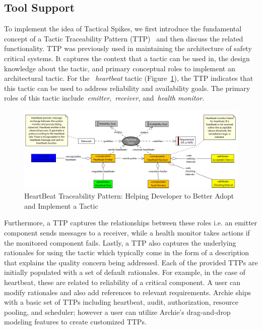 \subsection{Tool Support}
To implement the idea of Tactical Spikes, we first introduce the fundamental concept of a Tactic Traceability Pattern (TTP)~\cite{Mirakhorli:2011:TAS:1985793.1986014, ICSM11} and then discuss the related functionality. TTP was previously used in maintaining the architecture of safety critical systems. It captures the context that a tactic can be used in, the design knowledge about the tactic, and primary conceptual roles to implement an architectural tactic. For the ~\emph{heartbeat} tactic (Figure~\ref{fig:HB}), the TTP indicates that this tactic can be used to address reliability and availability goals. The primary roles of this tactic include~\emph{emitter},~\emph{receiver}, and~\emph{health monitor}. 

\begin{figure}[tbph]
\centering
\includegraphics[width=0.9\linewidth]{./HB}
\caption{HeartBeat Traceability Pattern: Helping Developer to Better Adopt and Implement a Tactic}
\label{fig:HB}
\end{figure}


Furthermore, a TTP captures the relationships between these roles i.e. an emitter component sends messages to a receiver, while a health monitor takes actions if the monitored component fails. Lastly, a TTP also captures the underlying rationales for using the tactic which typically come in the form of a description that explains the quality concern being addressed. Each of the provided TTPs are initially populated with a set of default rationales. For example, in the case of heartbeat, these are related to reliability of a critical component. A user can modify rationales and also add references to relevant requirements. Archie ships with a basic set of TTPs including heartbeat, audit, authorization, resource pooling, and scheduler; however a user can utilize Archie's drag-and-drop modeling features to create customized TTPs.


